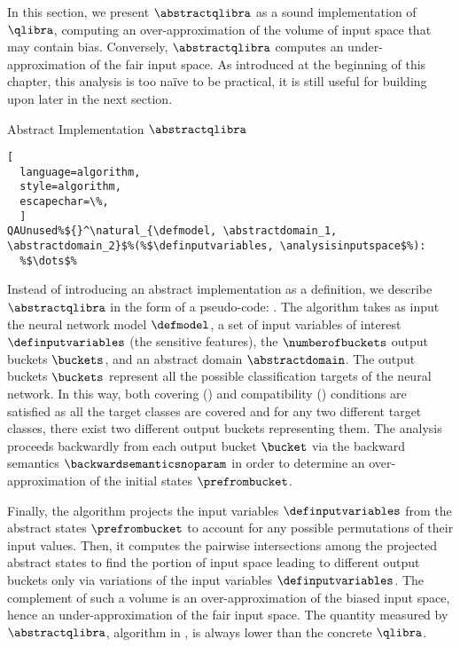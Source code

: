 In this section, we present $\abstractqlibra$ as a sound implementation of $\qlibra$, computing an over-approximation of the volume of input space that may contain bias. Conversely, $\abstractqlibra$ computes an under-approximation of the fair input space.
As introduced at the beginning of this chapter, this analysis is too na\"ive to be practical, it is still useful for building upon later in the next section.

\begin{marginalgorithm}
  \caption{Abstract Implementation $\abstractqlibra$}
\begin{lstlisting}[
  language=algorithm,
  style=algorithm,
  escapechar=\%,
  ]
QAUnused%${}^\natural_{\defmodel, \abstractdomain_1, \abstractdomain_2}$%(%$\definputvariables, \analysisinputspace$%):
  %$\dots$%
\end{lstlisting}
\end{marginalgorithm}

Instead of introducing an abstract implementation as a definition, we describe $\abstractqlibra$ in the form of a pseudo-code: .
The algorithm takes as input the neural network model $\defmodel$, a set of input variables of interest $\definputvariables$ (the sensitive features), the $\numberofbuckets$ output buckets $\buckets$, and an abstract domain $\abstractdomain$.
The output buckets $\buckets$ represent all the possible classification targets of the neural network.
In this way, both covering () and compatibility () conditions are satisfied as all the target classes are covered and for any two different target classes, there exist two different output buckets representing them.
The analysis proceeds backwardly from each output bucket $\bucket$ via the backward semantics $\backwardsemanticsnoparam$ in order to determine an over-approximation of the initial states $\prefrombucket$.

Finally, the algorithm projects the input variables $\definputvariables$ from the abstract states $\prefrombucket$ to account for any possible permutations of their input values.
Then, it computes the pairwise intersections among the projected abstract states to find the portion of input space leading to different output buckets only via variations of the input variables $\definputvariables$.
The complement of such a volume is an over-approximation of the biased input space, hence an under-approximation of the fair input space.
The quantity measured by $\abstractqlibra$, algorithm in , is always lower than the concrete $\qlibra$.

